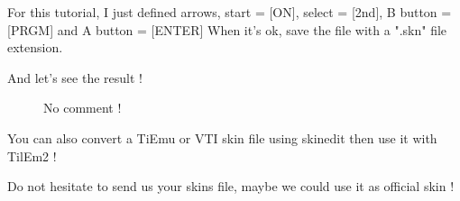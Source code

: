 \documentclass[10pt]{report}
\newcommand{\calckey}[1]{\textsf{[#1]}}
\begin{document}
For this tutorial, I just defined arrows, start = \calckey{ON}, select = \calckey{2nd}, B button = \calckey{PRGM} and A button = \calckey{ENTER}
When it's ok, save the file with a ".skn" file extension.\newline

And let's see the result ! 
\begin{figure}[H]
\centering
{}
\caption{No comment !}
\end{figure}

You can also convert a TiEmu or VTI skin file using skinedit then use it with TilEm2 !\newline

Do not hesitate to send us your skins file, maybe we could use it as official skin !\newline
\end{document}
